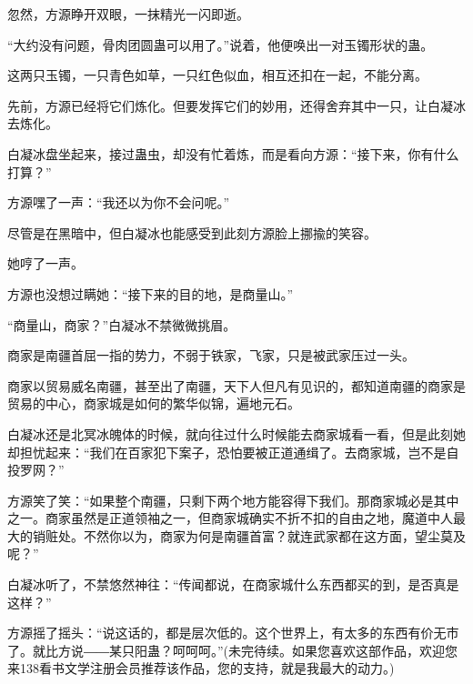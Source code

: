 \begin{this_body}
忽然，方源睁开双眼，一抹精光一闪即逝。

“大约没有问题，骨肉团圆蛊可以用了。”说着，他便唤出一对玉镯形状的蛊。

这两只玉镯，一只青色如草，一只红色似血，相互还扣在一起，不能分离。

先前，方源已经将它们炼化。但要发挥它们的妙用，还得舍弃其中一只，让白凝冰去炼化。

白凝冰盘坐起来，接过蛊虫，却没有忙着炼，而是看向方源：“接下来，你有什么打算？”

方源嘿了一声：“我还以为你不会问呢。”

尽管是在黑暗中，但白凝冰也能感受到此刻方源脸上挪揄的笑容。

她哼了一声。

方源也没想过瞒她：“接下来的目的地，是商量山。”

“商量山，商家？”白凝冰不禁微微挑眉。

商家是南疆首屈一指的势力，不弱于铁家，飞家，只是被武家压过一头。

商家以贸易威名南疆，甚至出了南疆，天下人但凡有见识的，都知道南疆的商家是贸易的中心，商家城是如何的繁华似锦，遍地元石。

白凝冰还是北冥冰魄体的时候，就向往过什么时候能去商家城看一看，但是此刻她却担忧起来：“我们在百家犯下案子，恐怕要被正道通缉了。去商家城，岂不是自投罗网？”

方源笑了笑：“如果整个南疆，只剩下两个地方能容得下我们。那商家城必是其中之一。商家虽然是正道领袖之一，但商家城确实不折不扣的自由之地，魔道中人最大的销赃处。不然你以为，商家为何是南疆首富？就连武家都在这方面，望尘莫及呢？”

白凝冰听了，不禁悠然神往：“传闻都说，在商家城什么东西都买的到，是否真是这样？”

方源摇了摇头：“说这话的，都是层次低的。这个世界上，有太多的东西有价无市了。就比方说――某只阳蛊？呵呵呵。”(未完待续。如果您喜欢这部作品，欢迎您来138看书文学注册会员推荐该作品，您的支持，就是我最大的动力。)

\end{this_body}

